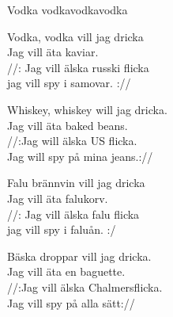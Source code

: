 \begin{song}{Vodka vodka}{vodkavodka}
\begin{vers}
Vodka, vodka vill jag dricka\\
Jag vill äta kaviar.\\
//: Jag vill älska russki flicka\\
jag vill spy i samovar. ://\\
\end{vers}
\begin{vers}
Whiskey, whiskey will jag dricka.\\
Jag vill äta baked beans.\\
//:Jag will älska US flicka.\\
Jag will spy på mina jeans.://\\
\end{vers}
\begin{vers}
Falu brännvin vill jag dricka\\
Jag vill äta falukorv.\\
//: Jag vill älska falu flicka   \\
jag vill spy i faluån. :/\\
\end{vers}
\begin{vers}
Bäska droppar vill jag dricka.\\
Jag vill äta en baguette.\\
//:Jag vill älska Chalmersflicka.\\
Jag vill spy på alla sätt://\\
\end{vers}
\end{song}
